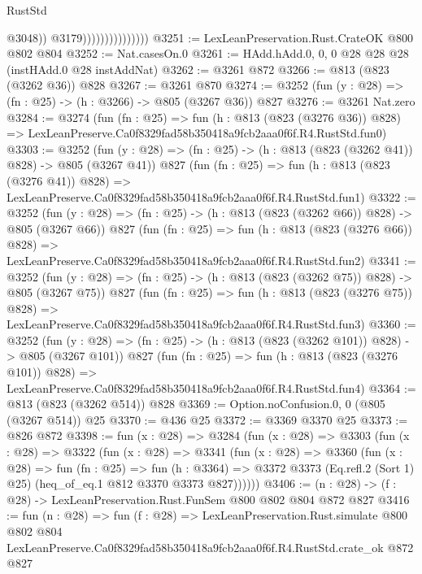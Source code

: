 \begin{lexlean}{RustStd}
\begin{coremodule}
                                      @3048))
                                  @3179)))))))))))))))
@3251 := LexLeanPreservation.Rust.CrateOK @800 @802 @804
@3252 := Nat.casesOn.{0}
@3261 := HAdd.hAdd.{0, 0, 0} @28 @28 @28 (instHAdd.{0} @28 instAddNat)
@3262 := @3261 @872
@3266 := @813 (@823 (@3262 @36)) @828
@3267 := @3261 @870
@3274 := @3252 (fun (y : @28) => (fn : @25) -> (h : @3266) -> @805 (@3267 @36)) @827
@3276 := @3261 Nat.zero
@3284 := @3274
    (fun (fn : @25) =>
    fun (h : @813 (@823 (@3276 @36)) @828) =>
    LexLeanPreserve.Ca0f8329fad58b350418a9fcb2aaa0f6f.R4.RustStd.fun0)
@3303 := @3252
    (fun (y : @28) => (fn : @25) -> (h : @813 (@823 (@3262 @41)) @828) -> @805 (@3267 @41))
    @827
    (fun (fn : @25) =>
    fun (h : @813 (@823 (@3276 @41)) @828) =>
    LexLeanPreserve.Ca0f8329fad58b350418a9fcb2aaa0f6f.R4.RustStd.fun1)
@3322 := @3252
    (fun (y : @28) => (fn : @25) -> (h : @813 (@823 (@3262 @66)) @828) -> @805 (@3267 @66))
    @827
    (fun (fn : @25) =>
    fun (h : @813 (@823 (@3276 @66)) @828) =>
    LexLeanPreserve.Ca0f8329fad58b350418a9fcb2aaa0f6f.R4.RustStd.fun2)
@3341 := @3252
    (fun (y : @28) => (fn : @25) -> (h : @813 (@823 (@3262 @75)) @828) -> @805 (@3267 @75))
    @827
    (fun (fn : @25) =>
    fun (h : @813 (@823 (@3276 @75)) @828) =>
    LexLeanPreserve.Ca0f8329fad58b350418a9fcb2aaa0f6f.R4.RustStd.fun3)
@3360 := @3252
    (fun (y : @28) => (fn : @25) -> (h : @813 (@823 (@3262 @101)) @828) -> @805 (@3267 @101))
    @827
    (fun (fn : @25) =>
    fun (h : @813 (@823 (@3276 @101)) @828) =>
    LexLeanPreserve.Ca0f8329fad58b350418a9fcb2aaa0f6f.R4.RustStd.fun4)
@3364 := @813 (@823 (@3262 @514)) @828
@3369 := Option.noConfusion.{0, 0} (@805 (@3267 @514)) @25
@3370 := @436 @25
@3372 := @3369 @3370 @25
@3373 := @826 @872
@3398 := fun (x : @28) =>
  @3284
    (fun (x : @28) =>
    @3303
      (fun (x : @28) =>
      @3322
        (fun (x : @28) =>
        @3341
          (fun (x : @28) =>
          @3360
            (fun (x : @28) =>
            fun (fn : @25) =>
            fun (h : @3364) =>
            @3372 @3373 (Eq.refl.{2} (Sort 1) @25) (heq_of_eq.{1} @812 @3370 @3373 @827))))))
@3406 := (n : @28) -> (f : @28) -> LexLeanPreservation.Rust.FunSem @800 @802 @804 @872 @827
@3416 := fun (n : @28) =>
  fun (f : @28) =>
  LexLeanPreservation.Rust.simulate
    @800
    @802
    @804
    LexLeanPreserve.Ca0f8329fad58b350418a9fcb2aaa0f6f.R4.RustStd.crate_ok
    @872
    @827
\end{coremodule}
\end{lexlean}
